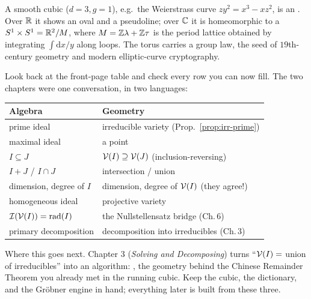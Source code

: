 
\begin{strand}
A smooth cubic ($d=3,g=1$), e.g.\ the Weierstrass curve $zy^2=x^3-xz^2$, is an . Over $\mathbb{R}$ it shows an oval and a pseudoline; over $\mathbb{C}$ it is homeomorphic to a
 $S^1\times S^1=\mathbb{R}^2/M$, where $M=\mathbb{Z}\lambda+\mathbb{Z}\tau$ is the period lattice obtained by
integrating $\int \mathrm dx/y$ along loops. The torus carries a group law, the seed of $19$th-century
geometry and modern elliptic-curve cryptography. 
\end{strand}


\begin{strand}
Look back at the front-page table and check every row you can now fill. The two chapters were one
conversation, in two languages:
\end{strand}
\noindent\begin{tabularx}{\linewidth}{@{}L L@{}}
\toprule
{\color{indigo}Algebra} & {\color{madder}Geometry}\\
\midrule
prime ideal & irreducible variety \;(Prop.\ \ref{prop:irr-prime})\\
maximal ideal & a point\\
$I\subseteq J$ & $\mathcal{V}(I)\supseteq\mathcal{V}(J)$ \;(inclusion-reversing)\\
$I+J$ \;/\; $I\cap J$ & intersection \;/\; union\\
dimension, degree of $I$ & dimension, degree of $\mathcal{V}(I)$ \;(they agree!)\\
homogeneous ideal & projective variety\\
$\mathcal{I}(\mathcal{V}(I))=\operatorname{rad}(I)$ & the Nullstellensatz bridge \;(Ch.\,6)\\
primary decomposition & decomposition into irreducibles \;(Ch.\,3)\\
\bottomrule
\end{tabularx}

\begin{strand}
Where this goes next. Chapter 3 (\emph{Solving and Decomposing}) turns ``$\mathcal{V}(I)=$ union of
irreducibles'' into an algorithm: , the geometry behind the Chinese
Remainder Theorem you already met in the running cubic. Keep the cubic, the dictionary, and the
Gröbner engine in hand; everything later is built from these three.
\end{strand}

